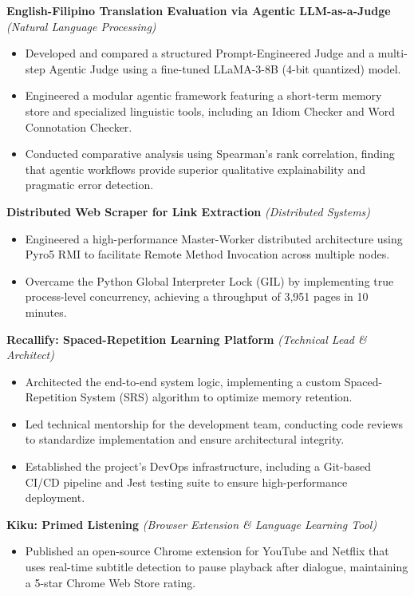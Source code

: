 \documentclass[10.5pt, letterpaper]{article}
\newcommand{\projectentry}[2]{%
    \par\noindent
    {\textbf{#1} \textit{(#2)}}\par\vspace{0.05em}
}
\begin{document}
\projectentry{English-Filipino Translation Evaluation via Agentic LLM-as-a-Judge}{Natural Language Processing}
\begin{itemize}
    \item Developed and compared a structured Prompt-Engineered Judge and a multi-step Agentic Judge using a fine-tuned LLaMA-3-8B (4-bit quantized) model.
    \item Engineered a modular agentic framework featuring a short-term memory store and specialized linguistic tools, including an Idiom Checker and Word Connotation Checker.
    \item Conducted comparative analysis using Spearman's rank correlation, finding that agentic workflows provide superior qualitative explainability and pragmatic error detection.
\end{itemize}

\projectentry{Distributed Web Scraper for Link Extraction}{Distributed Systems}
\begin{itemize}
    \item Engineered a high-performance Master-Worker distributed architecture using Pyro5 RMI to facilitate Remote Method Invocation across multiple nodes.
    \item Overcame the Python Global Interpreter Lock (GIL) by implementing true process-level concurrency, achieving a throughput of 3,951 pages in 10 minutes.
\end{itemize}

\projectentry{Recallify: Spaced-Repetition Learning Platform}{Technical Lead \& Architect}
\begin{itemize}
    \item Architected the end-to-end system logic, implementing a custom Spaced-Repetition System (SRS) algorithm to optimize memory retention.
    \item Led technical mentorship for the development team, conducting code reviews to standardize implementation and ensure architectural integrity.
    \item Established the project's DevOps infrastructure, including a Git-based CI/CD pipeline and Jest testing suite to ensure high-performance deployment.
\end{itemize}

\projectentry{Kiku: Primed Listening}{Browser Extension \& Language Learning Tool}
\begin{itemize}
    \item Published an open-source Chrome extension for YouTube and Netflix that uses real-time subtitle detection to pause playback after dialogue, maintaining a 5-star Chrome Web Store rating.
\end{itemize}
\end{document}
